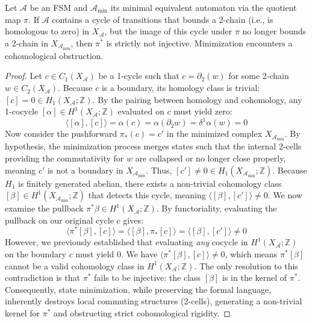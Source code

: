 \begin{theorem}
Let $\mathcal{A}$ be an FSM and $\mathcal{A}_{\text{min}}$ its minimal equivalent automaton via the quotient map $\pi$. If $\mathcal{A}$ contains a cycle of transitions that bounds a 2-chain (i.e., is homologous to zero) in $X_\mathcal{A}$, but the image of this cycle under $\pi$ no longer bounds a 2-chain in $X_{\mathcal{A}_{\text{min}}}$, then $\pi^*$ is strictly not injective. Minimization encounters a cohomological obstruction.
\end{theorem}
\begin{proof}
Let $c \in C_1(X_\mathcal{A})$ be a 1-cycle such that $c = \partial_2(w)$ for some 2-chain $w \in C_2(X_\mathcal{A})$. Because $c$ is a boundary, its homology class is trivial: $[c] = 0 \in H_1(X_\mathcal{A}; \mathbb{Z})$. By the pairing between homology and cohomology, any 1-cocycle $[\alpha] \in H^1(X_\mathcal{A}; \mathbb{Z})$ evaluated on $c$ must yield zero:
\[ \langle [\alpha], [c] \rangle = \alpha(c) = \alpha(\partial_2 w) = \delta^1\alpha(w) = 0 \]
Now consider the pushforward $\pi_*(c) = c'$ in the minimized complex $X_{\mathcal{A}_{\text{min}}}$. By hypothesis, the minimization process merges states such that the internal 2-cells providing the commutativity for $w$ are collapsed or no longer close properly, meaning $c'$ is not a boundary in $X_{\mathcal{A}_{\text{min}}}$. Thus, $[c'] \neq 0 \in H_1(X_{\mathcal{A}_{\text{min}}}; \mathbb{Z})$.
Because $H_1$ is finitely generated abelian, there exists a non-trivial cohomology class $[\beta] \in H^1(X_{\mathcal{A}_{\text{min}}}; \mathbb{Z})$ that detects this cycle, meaning $\langle [\beta], [c'] \rangle \neq 0$.
We now examine the pullback $\pi^* \beta \in H^1(X_\mathcal{A}; \mathbb{Z})$. By functoriality, evaluating the pullback on our original cycle $c$ gives:
\[ \langle \pi^* [\beta], [c] \rangle = \langle [\beta], \pi_* [c] \rangle = \langle [\beta], [c'] \rangle \neq 0 \]
However, we previously established that evaluating \emph{any} cocycle in $H^1(X_\mathcal{A}; \mathbb{Z})$ on the boundary $c$ must yield $0$. We have $\langle \pi^* [\beta], [c] \rangle \neq 0$, which means $\pi^* [\beta]$ cannot be a valid cohomology class in $H^1(X_\mathcal{A}; \mathbb{Z})$. 
The only resolution to this contradiction is that $\pi^*$ fails to be injective: the class $[\beta]$ is in the kernel of $\pi^*$.
Consequently, state minimization, while preserving the formal language, inherently destroys local commuting structures (2-cells), generating a non-trivial kernel for $\pi^*$ and obstructing strict cohomological rigidity.
\end{proof}

